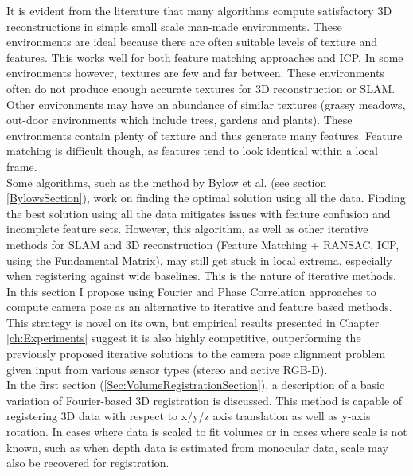 
It is evident from the literature that many algorithms compute satisfactory 3D reconstructions in simple small scale man-made environments. These environments are ideal because there are often suitable levels of texture and features. This works well for both feature matching approaches and ICP. In some environments however, textures are few and far between. These environments often do not produce enough accurate textures for 3D reconstruction or SLAM. \\

Other environments may have an abundance of similar textures (grassy meadows, out-door environments which include trees, gardens and plants). These environments contain plenty of texture and thus generate many features. Feature matching is difficult though, as features tend to look identical within a local frame. \\

Some algorithms, such as the method by Bylow et al. (see section \ref{BylowsSection}), work on finding the optimal solution using all the data. Finding the best solution using all the data mitigates issues with feature confusion and incomplete feature sets. However, this algorithm, as well as other iterative methods for SLAM and 3D reconstruction (Feature Matching + RANSAC, ICP, using the Fundamental Matrix), may still get stuck in local extrema, especially when registering against wide baselines. This is the nature of iterative methods. \\

In this section I propose using Fourier and Phase Correlation approaches to compute camera pose as an alternative to iterative and feature based methods. This strategy is novel on its own, but empirical results presented in Chapter \ref{ch:Experiments} suggest it is also highly competitive, outperforming the previously proposed iterative solutions to the camera pose alignment problem given input from various sensor types (stereo and active RGB-D). \\

In the first section (\ref{Sec:VolumeRegistrationSection}), a description of a basic variation of Fourier-based 3D registration is discussed. This method is capable of registering 3D data with respect to x/y/z axis translation as well as y-axis rotation. In cases where data is scaled to fit volumes or in cases where scale is not known, such as when depth data is estimated from monocular data, scale may also be recovered for registration. \\

